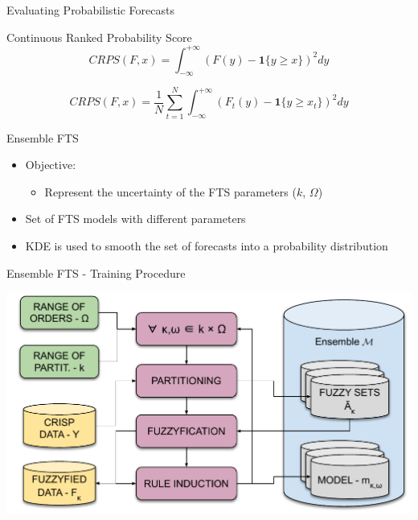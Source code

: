 \documentclass{beamer}
\begin{document}

\begin{frame}{Evaluating Probabilistic Forecasts}

Continuous Ranked Probability Score\cite{Gneitinga}
$$
CRPS(F,x) = \int_{-\infty}^{+\infty} (F(y) - \mathbf{1}\{y \geq x\})^2  dy
$$

$$
CRPS(F,x) = \frac{1}{N} \sum_{t=1}^{N} \int_{-\infty}^{+\infty} (F_t(y) - \mathbf{1}\{y \geq x_t\})^2  dy
$$
\end{frame}

\note[itemize]{
\item 
}


\begin{frame}{Ensemble FTS}
\linespread{2}
\begin{itemize}
    \item Objective:
    \begin{itemize}
        \item Represent the uncertainty of the FTS parameters ($k$, $\Omega$)
    \end{itemize}
    \item Set of FTS models with different parameters
    \item KDE is used to smooth the set of forecasts into a probability distribution
\end{itemize}
\end{frame}



\begin{frame}{Ensemble FTS - Training Procedure}
\includegraphics[width=\textwidth,height=8cm]{figures/ensemblefts_training.pdf}
\end{frame}
\end{document}
